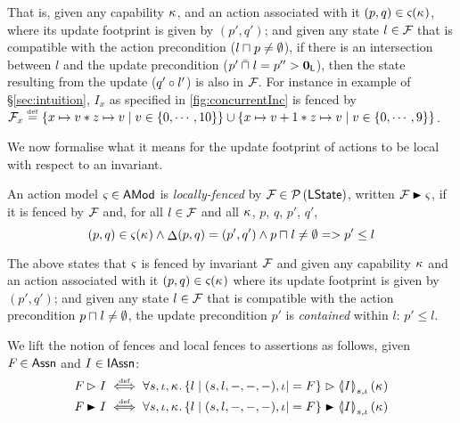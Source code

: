 That is, given any capability $\kappa_{}$, and an action associated with it $(p, q) \in \varsigma_{}(\kappa_{})$, where its update footprint is given by $(p', q')$; and given any state $l \in \mathcal{F}_{}$ that is compatible with the action precondition ($l \sqcap_{} p \not= \emptyset$), if there is an intersection between $l$ and the update precondition ($p' \mathbin{\bar{\sqcap}}_{} l = p'' > \mathbf{0}_{\textsf{L}}$), then the state resulting from the update ($q' \circ l'$) is also in $\mathcal{F}_{}$.
For instance in example of \S\ref{sec:intuition}, $I_x$ as specified in \fig\ref{fig:concurrentInc} is fenced by $\mathcal{F}_{x} \mathrel{\stackrel{\smash{\scriptscriptstyle{\mathrm{def}}}}{=}} \left\{x \mapsto v * z \mapsto v \mid v \in \{0, \cdots, 10\} \right\} \cup \left\{x \mapsto v+1 * z \mapsto v \mid v \in \{0 ,\cdots, 9 \}\right\}$.


We now formalise what it means for the update footprint of actions to
be local with respect to an invariant.

\begin{definition}
  An action model $\varsigma_{} \in \textsf{AMod}$ is \emph{locally-fenced} by
  $\mathcal{F}_{} \in \mathcal{P}\left(\textsf{LState} \right)$, written $\fence{} \strictfences
  \amod{}$, if it is fenced by $\mathcal{F}_{}$ and, for all $l\in\mathcal{F}_{}$
  and all $\kappa_{}$, $p$, $q$, $p'$, $q'$,
  \[
  (p, q) \in \varsigma_{}(\kappa_{}) \land 
  \mathop{\Delta}(p, q) = (p', q') \land 
  p \sqcap_{} l \neq \emptyset
  =>
  p' \leq l
  \]
\end{definition}


The above states that $\varsigma_{}$ is fenced by invariant $\mathcal{F}_{}$ and given any capability $\kappa_{}$ and an action associated with it $(p, q) \in \varsigma_{}(\kappa_{})$ where its update footprint is given by $(p', q')$; and given any state $l \in \mathcal{F}_{}$ that is compatible with the action precondition $p \sqcap_{} l \not= \emptyset$, the update precondition $p'$ is \emph{contained} within $l$: $p' \leq l$. 

We lift the notion of fences and local fences to
assertions as follows, given $F_{} \in \textsf{Assn}$ and $I \in
\textsf{IAssn}$:
\begin{align*}
  \fenceAss{} \fences I &\iffdef \for{s,\lenv,\ca{}}
  \{ l \mid (s,l, -, -, -), \lenv |= F \} \fences \semI[s,\lenv]{I}(\ca{})\\
  \fenceAss{} \strictfences I &\iffdef \for{s,\lenv,\ca{}}
  \{ l \mid (s,l, -, -, -), \lenv |= F \} \strictfences \semI[s,\lenv]{I}(\ca{})
\end{align*}




